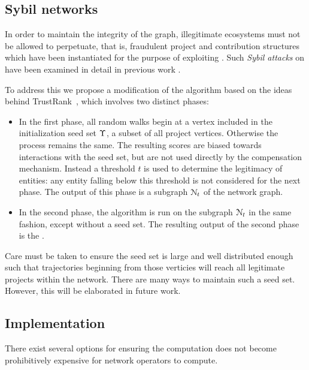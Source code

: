 \subsection{Sybil networks}

In order to maintain the integrity of the \oscoin{} graph,
illegitimate ecosystems must not be allowed to perpetuate, that is,
fraudulent project and contribution structures which have been instantiated
for the purpose of exploiting \osrank{}.
Such \emph{Sybil attacks} on \pagerank{} have been examined
in detail in previous work \cite{pagerank-sybil}.

To address this we propose a modification of the \pagerank{} algorithm based
on the ideas behind TrustRank~\cite{trustrank}, which involves two distinct
phases:

\begin{itemize}
\item In the first phase, all random walks begin at a vertex included in
  the initialization seed set $\Upsilon$, a subset of all project vertices.
  Otherwise the process remains the same. The resulting scores are biased towards
  interactions with the seed set, but are not used directly by the compensation
  mechanism. Instead a threshold $t$ is used to determine the legitimacy of entities: any entity
  falling below this threshold is not considered for the next phase. The output
  of this phase is a subgraph $\mathcal{N}_t$ of the network graph.
\item In the second phase, the algorithm is run on the subgraph
  $\mathcal{N}_t$ in the same fashion, except without a seed set. The resulting output of the second
  phase is the \osrank{}.
\end{itemize}

Care must be taken to ensure the seed set is large and well distributed enough such that
trajectories beginning from those verticies will reach all legitimate projects within the
network. There are many ways to maintain such a seed set. However, this will be elaborated
in future work.

\subsection{Implementation}

There exist several options for ensuring the \osrank{} computation
does not become prohibitively expensive for network operators to compute.


